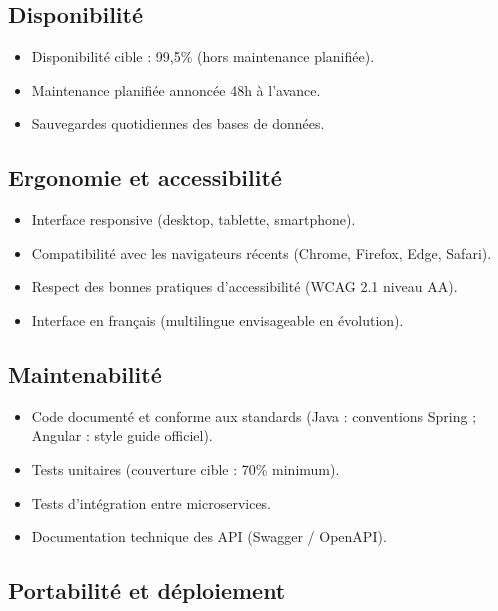 \documentclass[12pt,a4paper]{article}
\begin{document}
\subsection{Disponibilité}

\begin{itemize}[leftmargin=*,itemsep=4pt]
    \item Disponibilité cible : 99{,}5\% (hors maintenance planifiée).
    \item Maintenance planifiée annoncée 48h à l'avance.
    \item Sauvegardes quotidiennes des bases de données.
\end{itemize}

\subsection{Ergonomie et accessibilité}

\begin{itemize}[leftmargin=*,itemsep=4pt]
    \item Interface responsive (desktop, tablette, smartphone).
    \item Compatibilité avec les navigateurs récents (Chrome, Firefox, Edge, Safari).
    \item Respect des bonnes pratiques d'accessibilité (WCAG 2.1 niveau AA).
    \item Interface en français (multilingue envisageable en évolution).
\end{itemize}

\subsection{Maintenabilité}

\begin{itemize}[leftmargin=*,itemsep=4pt]
    \item Code documenté et conforme aux standards (Java : conventions Spring ; Angular : style guide officiel).
    \item Tests unitaires (couverture cible : 70\% minimum).
    \item Tests d'intégration entre microservices.
    \item Documentation technique des API (Swagger / OpenAPI).
\end{itemize}

\subsection{Portabilité et déploiement}
\end{document}
